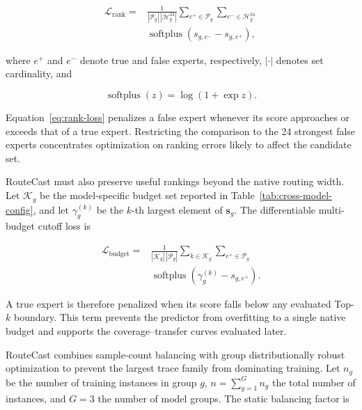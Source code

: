 \documentclass[conference]{IEEEtran}
\begin{document}
\begin{equation}
\begin{split}
\mathcal{L}_{\mathrm{rank}}
={}&
\frac{1}
{|\mathcal{P}_g|\,|\mathcal{H}_g^{24}|}
\sum_{e^{+}\in\mathcal{P}_g}
\sum_{e^{-}\in\mathcal{H}_g^{24}} \\
&\operatorname{softplus}
\left(s_{g,e^{-}}-s_{g,e^{+}}\right),
\end{split}
\label{eq:rank-loss}
\end{equation}

where \(e^{+}\) and \(e^{-}\) denote true and false experts, respectively,
\(|\cdot|\) denotes set cardinality, and

\begin{equation}
\operatorname{softplus}(z)=\log(1+\exp z).
\label{eq:softplus}
\end{equation}

Equation~\eqref{eq:rank-loss} penalizes a false expert whenever its score
approaches or exceeds that of a true expert. Restricting the comparison to the
24 strongest false experts concentrates optimization on ranking errors likely
to affect the candidate set.

RouteCast must also preserve useful rankings beyond the native routing width.
Let \(\mathcal{K}_g\) be the model-specific budget set reported in
Table~\ref{tab:cross-model-config}, and let \(\gamma_g^{(k)}\) be the
\(k\)-th largest element of \(\mathbf{s}_g\). The differentiable multi-budget
cutoff loss is

\begin{equation}
\begin{split}
\mathcal{L}_{\mathrm{budget}}
={}&
\frac{1}
{|\mathcal{K}_g|\,|\mathcal{P}_g|}
\sum_{k\in\mathcal{K}_g}
\sum_{e^{+}\in\mathcal{P}_g} \\
&\operatorname{softplus}
\left(\gamma_g^{(k)}-s_{g,e^{+}}\right).
\end{split}
\label{eq:budget-loss}
\end{equation}

A true expert is therefore penalized when its score falls below any evaluated
Top-\(k\) boundary. This term prevents the predictor from overfitting to a
single native budget and supports the coverage--transfer curves evaluated
later.

RouteCast combines sample-count balancing with group distributionally robust
optimization to prevent the largest trace family from dominating training.
Let \(n_g\) be the number of training instances in group \(g\),
\(n=\sum_{g=1}^{G}n_g\) the total number of instances, and \(G=3\) the number
of model groups. The static balancing factor is
\end{document}
